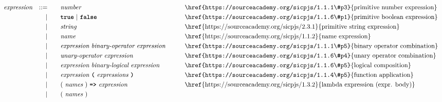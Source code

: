 \begin{alignat*}{9} 
&& \textit{expression}   && ::= &\quad &&  \textit{number}   && \textrm{\href{https://sourceacademy.org/sicpjs/1.1.1\#p3}{primitive number expression}}\\
&&                       && |   &\quad && \textbf{\texttt{true}}\ |\ \textbf{\texttt{false}}
                                                           && \textrm{\href{https://sourceacademy.org/sicpjs/1.1.6\#p1}{primitive boolean expression}}\\
&&                       && |   &\quad &&  \textit{string}   && \textrm{\href{https://sourceacademy.org/sicpjs/2.3.1}{primitive string expression}}\\
&&                       && |   &\quad &&  \textit{name}   && \textrm{\href{https://sourceacademy.org/sicpjs/1.1.2}{name expression}}\\
&&                       && |   &\quad &&  \textit{expression} \  \textit{binary-operator} \ 
                                            \textit{expression} \qquad
                                                           && \textrm{\href{https://sourceacademy.org/sicpjs/1.1.1\#p5}{binary operator combination}}\\
&&                       && |   &\quad &&   \textit{unary-operator} \ 
                                            \textit{expression}
                                                           && \textrm{\href{https://sourceacademy.org/sicpjs/1.1.6\#p4}{unary operator combination}}\\
&&                       && |   &\quad &&  \textit{expression} \  \textit{binary-logical} \ 
                                            \textit{expression} \qquad
                                                           && \textrm{\href{https://sourceacademy.org/sicpjs/1.1.6\#p5}{logical composition}}\\
&&                       && |   &\quad &&   \textit{expression}\ \textbf{\texttt{(}}\ \textit{expressions}\ \textbf{\texttt{)}}
                                                           && \textrm{\href{https://sourceacademy.org/sicpjs/1.1.4\#p5}{function application}}\\
&&                       && |   &\quad &&   (\ \textit{names}\ )\    
                                            \texttt{\textbf{=>}}\ \textit{expression}
                                                           && \textrm{\href{https://sourceacademy.org/sicpjs/1.3.2}{lambda expression (expr. body)}}\\
&&                       && |   &\quad &&   (\ \textit{names}\ )\    

\end{alignat*}
